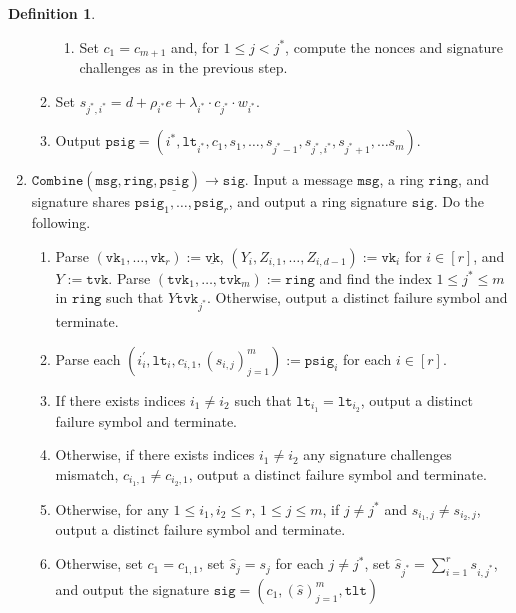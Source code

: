 \documentclass[11pt]{article}
\theoremstyle{definition}
\newtheorem{definition}[definition]{Definition}
\newcommand{\vk}{\texttt{vk}}
\newcommand{\lt}{\texttt{lt}}
\newcommand{\tlt}{\texttt{tlt}}
\newcommand{\tvk}{\texttt{tvk}}
\newcommand{\ring}{\texttt{ring}}
\newcommand{\VK}{\underline{\texttt{vk}}}
\newcommand{\sig}{\texttt{sig}}
\newcommand{\psig}{\texttt{psig}}
\newcommand{\psigs}{\underline{\texttt{psig}}}
\newcommand{\msg}{\texttt{msg}}
\newcommand{\combine}{\texttt{Combine}}
\begin{document}
\begin{definition}
\begin{enumerate}
\begin{enumerate}
\begin{enumerate}
\item Set $c_1 = c_{m+1}$ and, for $1 \leq j < j^*$, compute the nonces and signature challenges as in the previous step.

\end{enumerate}

\item Set $s_{j^*, i^*} = d + \rho_{i^*} e + \lambda_{i^*} \cdot c_{j^*} \cdot w_{i^*}$.

\item Output $\psig = (i^*, \lt_{i^*}, c_1, s_1, \ldots, s_{j^*-1}, s_{j^*, i^*}, s_{j^*+1}, \ldots s_m)$.
\end{enumerate}

\item $\combine(\msg, \ring, \psigs) \to \sig$. Input a message $\msg$, a ring $\ring$, and signature shares $\psig_1, \ldots, \psig_r$, and output a ring signature $\sig$. Do the following.
\begin{enumerate}
\item Parse $(\vk_1, \ldots, \vk_r) := \VK$, $(Y_i, Z_{i,1}, \ldots, Z_{i,d-1}) := \vk_i$ for $i \in [r]$, and $Y := \tvk$. Parse $(\tvk_1, \ldots, \tvk_m) := \ring$ and find the index $1 \leq j^* \leq m$ in $\ring$ such that $Y  \tvk_{j^*}$. Otherwise, output a distinct failure symbol and terminate.

\item Parse each $(i^\prime_i, \lt_i, c_{i,1}, (s_{i,j})_{j=1}^{m}) := \psig_i$ for each $i \in [r]$. 

\item If there exists indices $i_1 \neq i_2$ such that $\lt_{i_1} = \lt_{i_2}$, output a distinct failure symbol and terminate. 

\item Otherwise, if there exists indices $i_1 \neq i_2$ any signature challenges mismatch, $c_{i_1,1} \neq c_{i_2, 1}$, output a distinct failure symbol and terminate.

\item Otherwise, for any $1 \leq i_1, i_2 \leq r$, $1 \leq j \leq m$, if $j \neq j^*$ and $s_{i_1,j} \neq s_{i_2, j}$, output a distinct failure symbol and terminate.

\item Otherwise, set $c_1 = c_{1,1}$, set $\widehat{s}_j = s_j$ for each $j \neq j^*$, set $\widehat{s}_{j^*} = \sum_{i=1}^{r} s_{i,j^*}$, and output the signature $\sig = (c_1, (\widehat{s})_{j=1}^{m}, \tlt)$
\end{enumerate}


\end{enumerate}
\end{definition}
\end{document}
